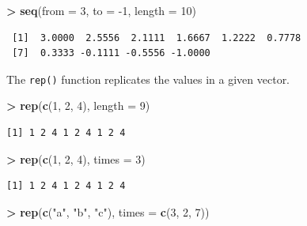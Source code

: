 \documentclass[]{krantz}
\makeatletter
\newenvironment{Shaded}{\begin{snugshade}}{\end{snugshade}}
\newcommand{\DataTypeTok}[1]{\textcolor[rgb]{0.27,0.27,0.27}{#1}}
\newcommand{\DecValTok}[1]{\textcolor[rgb]{0.06,0.06,0.06}{#1}}
\newcommand{\KeywordTok}[1]{\textcolor[rgb]{0.27,0.27,0.27}{\textbf{#1}}}
\newcommand{\NormalTok}[1]{#1}
\newcommand{\OperatorTok}[1]{\textcolor[rgb]{0.43,0.43,0.43}{\textbf{#1}}}
\newcommand{\StringTok}[1]{\textcolor[rgb]{0.5,0.5,0.5}{#1}}
\newenvironment{kframe}{%
\medskip{}
\setlength{\fboxsep}{.8em}
 \def\at@end@of@kframe{}%
 \ifinner\ifhmode%
  \def\at@end@of@kframe{\end{minipage}}%
  \begin{minipage}{\columnwidth}%
 \fi\fi%
 \def\FrameCommand##1{\hskip\@totalleftmargin \hskip-\fboxsep
 \colorbox{shadecolor}{##1}\hskip-\fboxsep
     \hskip-\linewidth \hskip-\@totalleftmargin \hskip\columnwidth}%
 \MakeFramed {\advance\hsize-\width
   \@totalleftmargin\z@ \linewidth\hsize
   \@setminipage}}%
 {\par\unskip\endMakeFramed%
 \at@end@of@kframe}
\renewenvironment{Shaded}{\begin{kframe}}{\end{kframe}}
\makeatother
\begin{document}
\begin{Shaded}
\begin{Highlighting}[]
\OperatorTok{>}\StringTok{ }\KeywordTok{seq}\NormalTok{(}\DataTypeTok{from =} \DecValTok{3}\NormalTok{, }\DataTypeTok{to =} \DecValTok{-1}\NormalTok{, }\DataTypeTok{length =} \DecValTok{10}\NormalTok{)}
\end{Highlighting}
\end{Shaded}

\begin{verbatim}
 [1]  3.0000  2.5556  2.1111  1.6667  1.2222  0.7778
 [7]  0.3333 -0.1111 -0.5556 -1.0000
\end{verbatim}

The \texttt{rep()} function replicates the values in a given vector.

\begin{Shaded}
\begin{Highlighting}[]
\OperatorTok{>}\StringTok{ }\KeywordTok{rep}\NormalTok{(}\KeywordTok{c}\NormalTok{(}\DecValTok{1}\NormalTok{, }\DecValTok{2}\NormalTok{, }\DecValTok{4}\NormalTok{), }\DataTypeTok{length =} \DecValTok{9}\NormalTok{)}
\end{Highlighting}
\end{Shaded}

\begin{verbatim}
[1] 1 2 4 1 2 4 1 2 4
\end{verbatim}

\begin{Shaded}
\begin{Highlighting}[]
\OperatorTok{>}\StringTok{ }\KeywordTok{rep}\NormalTok{(}\KeywordTok{c}\NormalTok{(}\DecValTok{1}\NormalTok{, }\DecValTok{2}\NormalTok{, }\DecValTok{4}\NormalTok{), }\DataTypeTok{times =} \DecValTok{3}\NormalTok{)}
\end{Highlighting}
\end{Shaded}

\begin{verbatim}
[1] 1 2 4 1 2 4 1 2 4
\end{verbatim}

\begin{Shaded}
\begin{Highlighting}[]
\OperatorTok{>}\StringTok{ }\KeywordTok{rep}\NormalTok{(}\KeywordTok{c}\NormalTok{(}\StringTok{"a"}\NormalTok{, }\StringTok{"b"}\NormalTok{, }\StringTok{"c"}\NormalTok{), }\DataTypeTok{times =} \KeywordTok{c}\NormalTok{(}\DecValTok{3}\NormalTok{, }\DecValTok{2}\NormalTok{, }\DecValTok{7}\NormalTok{))}
\end{Highlighting}
\end{Shaded}
\end{document}
